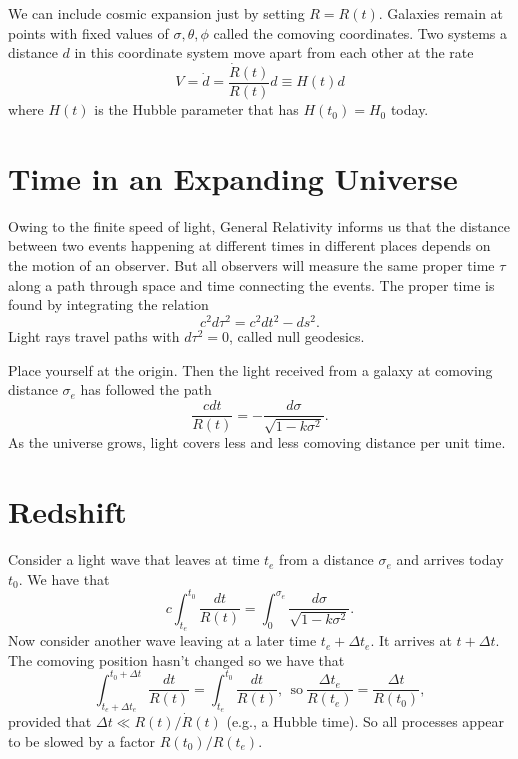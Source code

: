 \documentclass[]{article}
\begin{document}
We can include cosmic expansion just by setting $R = R(t)$. Galaxies
remain at points with fixed values of $\sigma, \theta, \phi$ called
the comoving coordinates.  Two systems a distance $d$ in this coordinate system
move apart from each other at the rate
\begin{equation}
V = \dot{d} = \frac{\dot{R}(t)}{R(t)}d \equiv H(t) d
\end{equation}
\noindent
where $H(t)$ is the Hubble parameter that has $H(t_0) = H_0$
today.

\section{Time in an Expanding Universe}
Owing to the finite speed of light, General Relativity
informs us that the distance between two events happening
at different times in different places depends on  the
motion of an observer.  But all observers will measure
the same proper time $\tau$ along a path through space
and time connecting the events.  The proper time
is found by integrating the relation
\begin{equation}
c^2 d\tau^2 = c^2 dt^2 - ds^2.
\end{equation}
\noindent
Light rays travel paths with $d\tau^2 = 0$, called
null geodesics.

Place yourself at the origin.  Then the light
received from a galaxy at comoving distance
$\sigma_e$ has followed the path
\begin{equation}
\frac{c dt}{R(t)} = -\frac{d\sigma}{\sqrt{1-k\sigma^2}}.
\end{equation}
\noindent
As the universe grows, light covers less and less 
comoving distance per unit time.

\section{Redshift}

Consider a light wave that leaves at time $t_e$
from a distance $\sigma_e$ and arrives today $t_0$.
We have that
\begin{equation}
c\int_{t_e}^{t_0} \frac{dt}{R(t)} = \int_0^{\sigma_e} \frac{d\sigma}{\sqrt{1-k\sigma^2}}.
\end{equation}
\noindent
Now consider another wave leaving at a later time $t_e + \Delta t_e$.
It arrives at $t + \Delta t$.  The comoving position hasn't changed
so we have that
\begin{equation}
\int_{t_e+\Delta t_e}^{t_0 + \Delta t} \frac{dt}{R(t)} = \int_{t_e}^{t_0} \frac{dt}{R(t)},~~\mathrm{so}~\frac{\Delta t_e}{R(t_e)} = \frac{\Delta t}{R(t_0)},
\end{equation}
\noindent
provided that $\Delta t \ll R(t)/\dot{R}(t)$ (e.g., a Hubble time).  So all processes appear to be
slowed by a factor $R(t_0)/R(t_e)$.
\end{document}
